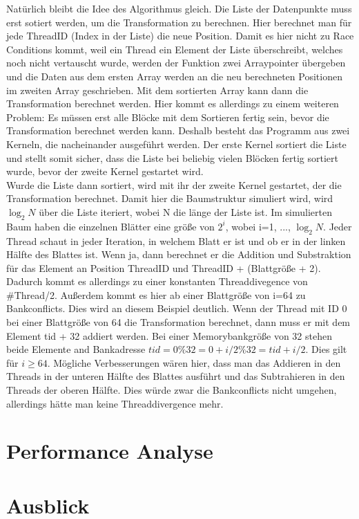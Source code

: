 \documentclass[sigconf]{acmart}
\begin{document}
Natürlich bleibt die Idee des Algorithmus gleich. Die Liste der Datenpunkte muss erst sotiert werden, um die Transformation zu berechnen. Hier berechnet man für jede ThreadID (Index in der Liste) die neue Position. Damit es hier nicht zu Race Conditions kommt, weil ein Thread ein Element der Liste überschreibt, welches noch nicht vertauscht wurde, werden der Funktion zwei Arraypointer übergeben und die Daten aus dem ersten Array werden an die neu berechneten Positionen im zweiten Array geschrieben. Mit dem sortierten Array kann dann die Transformation berechnet werden. Hier kommt es allerdings zu einem weiteren Problem: Es müssen erst alle Blöcke mit dem Sortieren fertig sein, bevor die Transformation berechnet werden kann. Deshalb besteht das Programm aus zwei Kerneln, die nacheinander ausgeführt werden. Der erste Kernel sortiert die Liste und stellt somit sicher, dass die Liste bei beliebig vielen Blöcken fertig sortiert wurde, bevor der zweite Kernel gestartet wird.\\ Wurde die Liste dann sortiert, wird mit ihr der zweite Kernel gestartet, der die Transformation berechnet. Damit hier die Baumstruktur simuliert wird, wird $\log_2 N$ über die Liste iteriert, wobei N die länge der Liste ist. Im simulierten Baum haben die einzelnen Blätter eine größe von $2^i$, wobei i=1, ..., $\log_2 N$. Jeder Thread schaut in jeder Iteration, in welchem Blatt er ist und ob er in der linken Hälfte des Blattes ist. Wenn ja, dann berechnet er die Addition und Substraktion für das Element an Position ThreadID und ThreadID + (Blattgröße + 2). Dadurch kommt es allerdings zu einer konstanten Threaddivegence von \#Thread/2. Außerdem kommt es hier ab einer Blattgröße von i=64 zu Bankconflicts. Dies wird an diesem Beispiel deutlich. Wenn der Thread mit ID 0 bei einer Blattgröße von 64 die Transformation berechnet, dann muss er mit dem Element tid + 32 addiert werden. Bei einer Memorybankgröße von 32 stehen beide Elemente and Bankadresse $tid = 0 \% 32 = 0+i/2 \% 32 = tid + i/2$. Dies gilt für $i \geq 64$. Mögliche Verbesserungen wären hier, dass man das Addieren in den Threads in der unteren Hälfte des Blattes ausführt und das Subtrahieren in den Threads der oberen Hälfte. Dies würde zwar die Bankconflicts nicht umgehen, allerdings hätte man keine Threaddivergence mehr.

\section{Performance Analyse}

\section{Ausblick}
\end{document}
